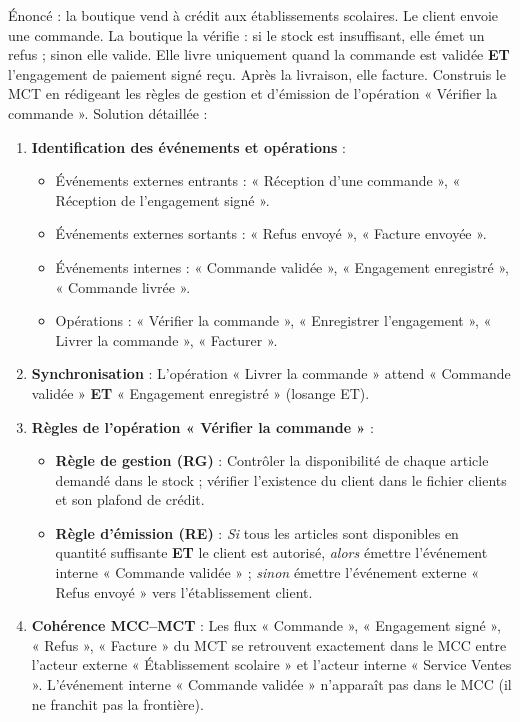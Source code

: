 \documentclass[11pt]{article}
\begin{document}
\begin{exoresolu}
Énoncé : la boutique vend à crédit aux établissements scolaires. Le client envoie une commande. La boutique la vérifie : si le stock est insuffisant, elle émet un refus ; sinon elle valide. Elle livre uniquement quand la commande est validée \textbf{ET} l'engagement de paiement signé reçu. Après la livraison, elle facture. Construis le MCT en rédigeant les règles de gestion et d'émission de l'opération « Vérifier la commande ».
\tcblower
Solution détaillée :
\begin{enumerate}
\item \textbf{Identification des événements et opérations} :
      \begin{itemize}
      \item Événements externes entrants : « Réception d'une commande », « Réception de l'engagement signé ».
      \item Événements externes sortants : « Refus envoyé », « Facture envoyée ».
      \item Événements internes : « Commande validée », « Engagement enregistré », « Commande livrée ».
      \item Opérations : « Vérifier la commande », « Enregistrer l'engagement », « Livrer la commande », « Facturer ».
      \end{itemize}
\item \textbf{Synchronisation} : L'opération « Livrer la commande » attend « Commande validée » \textbf{ET} « Engagement enregistré » (losange ET).
\item \textbf{Règles de l'opération « Vérifier la commande »} :
      \begin{itemize}
      \item \textbf{Règle de gestion (RG)} : Contrôler la disponibilité de chaque article demandé dans le stock ; vérifier l'existence du client dans le fichier clients et son plafond de crédit.
      \item \textbf{Règle d'émission (RE)} : \emph{Si} tous les articles sont disponibles en quantité suffisante \textbf{ET} le client est autorisé, \emph{alors} émettre l'événement interne « Commande validée » ; \emph{sinon} émettre l'événement externe « Refus envoyé » vers l'établissement client.
      \end{itemize}
\item \textbf{Cohérence MCC--MCT} : Les flux « Commande », « Engagement signé », « Refus », « Facture » du MCT se retrouvent exactement dans le MCC entre l'acteur externe « Établissement scolaire » et l'acteur interne « Service Ventes ». L'événement interne « Commande validée » n'apparaît pas dans le MCC (il ne franchit pas la frontière).
\end{enumerate}
\end{exoresolu}
\end{document}
